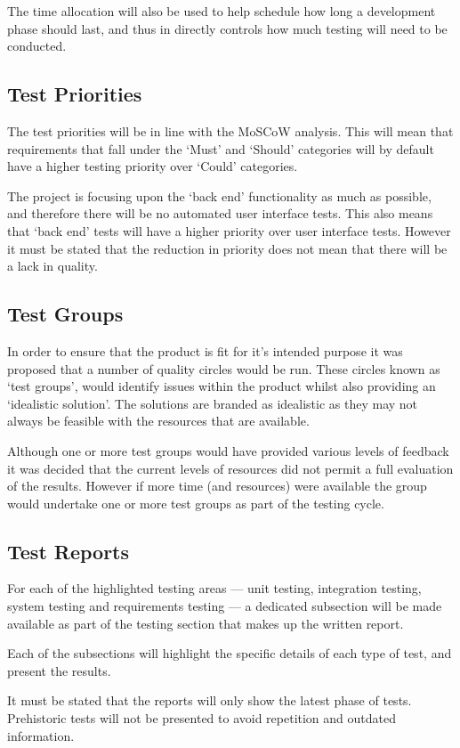 The time allocation will also be used to help schedule how long a development 
phase should last, and thus in directly controls how much testing will need to
be conducted.


\subsection{Test Priorities}
\label{sub:test_priorities}

The test priorities will be in line with the MoSCoW analysis. This will mean 
that requirements that fall under the `Must' and `Should' categories will by 
default have a higher testing priority over `Could' categories.

The project is focusing upon the `back end' functionality as much as possible, 
and therefore there will be no automated user interface tests. This also means
that `back end' tests will have a higher priority over user interface tests. 
However it must be stated that the reduction in priority does not mean that 
there will be a lack in quality.


\subsection{Test Groups}
\label{sub:test_groups}

In order to ensure that the product is fit for it's intended purpose it was 
proposed that a number of quality circles would be run. These circles known as 
`test groups', would identify issues within the product whilst also providing an
`idealistic solution'. The solutions are branded as idealistic as they may not 
always be feasible with the resources that are available.

Although one or more test groups would have provided various levels of feedback
it was decided that the current levels of resources did not permit a full 
evaluation of the results. However if more time (and resources) were available 
the group would undertake one or more test groups as part of the testing cycle.


\subsection{Test Reports}
\label{sub:test_reports}

For each of the highlighted testing areas --- unit testing, integration testing,
system testing and requirements testing --- a dedicated subsection will be 
made available as part of the testing section that makes up the written report.

Each of the subsections will highlight the specific details of each type of 
test, and present the results.

It must be stated that the reports will only show the latest phase of tests. 
Prehistoric tests will not be presented to avoid repetition and outdated
information.
